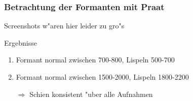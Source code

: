 \documentclass[11pt]{beamer}
\begin{document}
\begin{frame}
\frametitle{Betrachtung der Formanten mit Praat}
Screenshots w"aren hier leider zu gro"s
\begin{block}{Ergebnisse}
\begin{enumerate}
\item Formant normal zwischen 700-800, Lispeln 500-700
\item Formant normal zwischen 1500-2000, Lispeln 1800-2200
\item[$\Rightarrow$] Schien konsistent "uber alle Aufnahmen
\end{enumerate}
\end{block}
\end{frame}
\end{document}
